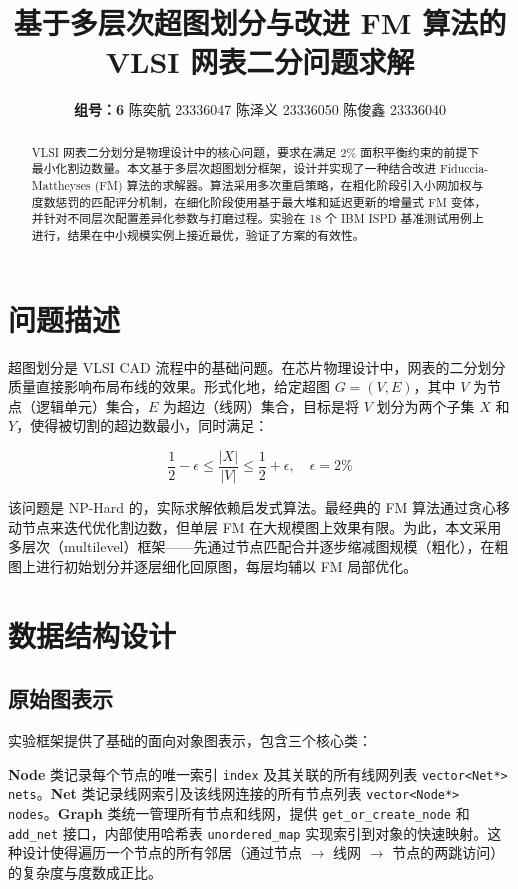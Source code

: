 \documentclass[journal, twocolumn]{IEEEtran}
\title{\textbf{基于多层次超图划分与改进 FM 算法的 VLSI 网表二分问题求解}}
\author{\textbf{组号：6} \quad 陈奕航 23336047 \quad 陈泽义 23336050 \quad 陈俊鑫 23336040}
\begin{document}
\maketitle

\begin{abstract}
VLSI 网表二分划分是物理设计中的核心问题，要求在满足 2\% 面积平衡约束的前提下最小化割边数量。本文基于多层次超图划分框架，设计并实现了一种结合改进 Fiduccia-Mattheyses (FM) 算法的求解器。算法采用多次重启策略，在粗化阶段引入小网加权与度数惩罚的匹配评分机制，在细化阶段使用基于最大堆和延迟更新的增量式 FM 变体，并针对不同层次配置差异化参数与打磨过程。实验在 18 个 IBM ISPD 基准测试用例上进行，结果在中小规模实例上接近最优，验证了方案的有效性。
\end{abstract}

\section{问题描述}

超图划分是 VLSI CAD 流程中的基础问题。在芯片物理设计中，网表的二分划分质量直接影响布局布线的效果。形式化地，给定超图 $G = (V, E)$，其中 $V$ 为节点（逻辑单元）集合，$E$ 为超边（线网）集合，目标是将 $V$ 划分为两个子集 $X$ 和 $Y$，使得被切割的超边数最小，同时满足：

\begin{equation}
\frac{1}{2} - \epsilon \le \frac{|X|}{|V|} \le \frac{1}{2} + \epsilon, \quad \epsilon = 2\%
\end{equation}

该问题是 NP-Hard 的，实际求解依赖启发式算法。最经典的 FM 算法通过贪心移动节点来迭代优化割边数，但单层 FM 在大规模图上效果有限。为此，本文采用多层次（multilevel）框架——先通过节点匹配合并逐步缩减图规模（粗化），在粗图上进行初始划分并逐层细化回原图，每层均辅以 FM 局部优化。

\section{数据结构设计}
\label{sec:datastruct}

\subsection{原始图表示}

实验框架提供了基础的面向对象图表示，包含三个核心类：

\textbf{Node} 类记录每个节点的唯一索引 \texttt{index} 及其关联的所有线网列表 \texttt{vector<Net*> nets}。\textbf{Net} 类记录线网索引及该线网连接的所有节点列表 \texttt{vector<Node*> nodes}。\textbf{Graph} 类统一管理所有节点和线网，提供 \texttt{get\_or\_create\_node} 和 \texttt{add\_net} 接口，内部使用哈希表 \texttt{unordered\_map} 实现索引到对象的快速映射。这种设计使得遍历一个节点的所有邻居（通过节点 $\to$ 线网 $\to$ 节点的两跳访问）的复杂度与度数成正比。
\end{document}
